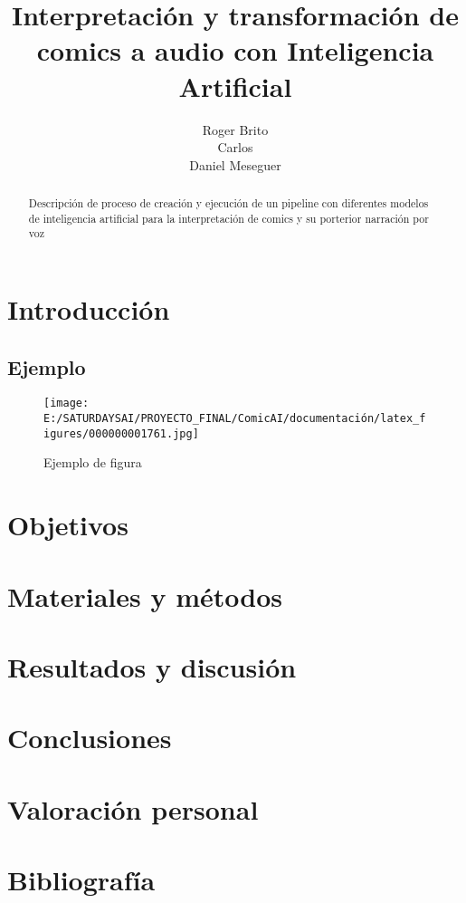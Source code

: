 \documentclass[a4paper,10pt]{article}
\title{Interpretación y transformación de comics a audio con Inteligencia Artificial}
\author{Roger Brito \\ Carlos \\ Daniel Meseguer}
\begin{document}
\maketitle

\begin{abstract}
Descripción de proceso de creación y ejecución de un pipeline con diferentes modelos de inteligencia artificial 
para la interpretación de comics y su porterior narración por voz 
\end{abstract}

\tableofcontents

\newpage

    \section{Introducción}
        \subsection{Ejemplo}
            \begin{figure}[h]
                \texttt{[image: E:/SATURDAYSAI/PROYECTO\_FINAL/ComicAI/documentación/latex\_figures/000000001761.jpg]}
                \centering
                \caption{Ejemplo de figura}
                \centering
                \label{figure_1}
            \end{figure}
    
    \section{Objetivos}
    
    \section{Materiales y métodos}

    \section{Resultados y discusión}

    \section{Conclusiones}

    \section{Valoración personal}

    \section{Bibliografía}
    
    \newpage
    \listoffigures
\end{document}
